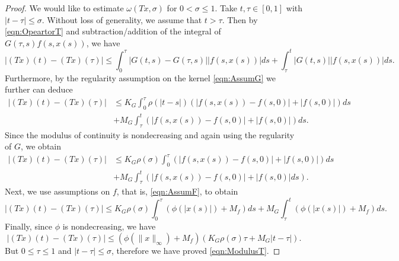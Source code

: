 \documentclass[12pt,a4paper]{article}
\begin{document}
\begin{proof}
	We would like to estimate $\omega(Tx, \sigma)$ for $0<\sigma \leq 1$. Take $t,\tau \in [0,1]$ with $|t-\tau| \leq \sigma$. Without loss of generality, we assume that $t > \tau$. Then by \eqref{eqn:OpeartorT} and subtraction/addition of the integral of $G(\tau, s)f(s, x(s))$, we have
	\begin{equation}
		|(Tx)(t) - (Tx)(\tau)| \leq \int_0^\tau |G(t,s) - G(\tau, s)| |f(s, x(s))| ds + \int_\tau^t |G(t,s)| |f(s, x(s))| ds.
	\end{equation}
	Furthermore, by the regularity assumption on the kernel \eqref{eqn:AssumG} we further can deduce
	\begin{equation}
		\begin{split}
			|(Tx)(t) - (Tx)(\tau)| 
			&\leq K_G \int_0^\tau \rho(|t-s|) \left(|f(s, x(s)) - f(s, 0)| + |f(s,0)| \right)ds \\
			&+ M_G \int_\tau^t \left(|f(s, x(s)) - f(s, 0)| + |f(s,0)| \right) ds.
		\end{split}
	\end{equation}
	Since the modulus of continuity is nondecreasing and again using the regularity of $G$, we obtain
	\begin{equation}
		\begin{split}
			|(Tx)(t) - (Tx)(\tau)| 
			&\leq K_G \rho(\sigma) \int_0^\tau \left(|f(s, x(s)) - f(s, 0)| + |f(s,0)| \right)ds\\
			&+ M_G \int_\tau^t \left(|f(s, x(s)) - f(s, 0)| + |f(s,0)| ds \right).
		\end{split}
	\end{equation}
	Next, we use assumptions on $f$, that is, \eqref{eqn:AssumF}, to obtain
	\begin{equation}
		|(Tx)(t) - (Tx)(\tau)| \leq K_G \rho(\sigma) \int_0^\tau \left(\phi(|x(s)|) + M_f \right)ds + M_G \int_\tau^t \left(\phi(|x(s)|) + M_f \right)ds.
	\end{equation}
	Finally, since $\phi$ is nondecreasing, we have
	\begin{equation}
		|(Tx)(t) - (Tx)(\tau)| \leq \left(\phi(\|x\|_\infty) + M_f \right)\left(K_G\rho(\sigma) \tau + M_G |t-\tau|\right).
	\end{equation}
	But $0\leq \tau\leq 1$ and $|t-\tau|\leq \sigma$, therefore we have proved \eqref{eqn:ModulusT}. 
\end{proof}
\end{document}
